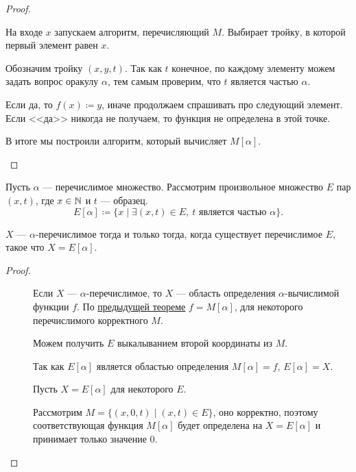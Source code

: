 \begin{proof}
\begin{description}
		   На входе $ x$ запускаем алгоритм, перечисляющий  $ M$. Выбирает тройку, в которой первый элемент равен $ x$. 

		   Обозначим тройку $ (x, y, t)$. Так как  $ t$ конечное, по каждому элементу можем задать вопрос оракулу  $  \alpha $, тем самым проверим, что $ t$ является частью $  \alpha $.

		   Если да, то $ f(x) \coloneqq y$, иначе продолжаем спрашивать про следующий элемент.
		   Если <<да>> никогда не получаем, то функция не определена в этой точке.

		   В итоге мы построили алгоритм, который вычисляет $ M[ \alpha ]$.
   \end{description} 
\end{proof}

\begin{defn}
	Пусть $  \alpha $ --- перечислимое множество. Рассмотрим произвольное множество $ E$ пар  $ (x, t)$, где  $ x \in \mathbb{N}$ и $ t$ --- образец.
	\[
		E[ \alpha ] \coloneqq \{x \mid \exists (x, t) \in E, ~ t \text{ является частью } \alpha \}
	.\] 
\end{defn}

\begin{thm}
	$ X$ --- $  \alpha $-перечислимое тогда и только тогда, когда существует перечислимое $ E$, такое что  $ X = E[ \alpha ]$.
\end{thm}
\begin{proof}
    ~\begin{description}
		\item[]
			Если $ X$ ---  $  \alpha $-перечислимое, то $ X$ --- область определения  $  \alpha $-вычислимой функции $ f$. По \hyperref[thm:malp]{предыдущей теореме} $ f = M[ \alpha ]$, для некоторого перечислимого корректного $ M$.

			Можем получить  $ E$ выкалыванием второй координаты из $ M$.

			Так как $ E[ \alpha ]$ является областью определения $ M[ \alpha ] = f$, $ E[ \alpha ] = X$.
        \item[]
			Пусть $ X = E[ \alpha ]$ для некоторого $ E$.

			Рассмотрим  $ M = \{(x, 0, t) \mid (x, t) \in  E\}$, оно корректно, поэтому соответствующая функция $ M[ \alpha ]$ будет определена на $ X = E[ \alpha ]$ и принимает только значение $ 0$.
    \end{description} 
\end{proof}

